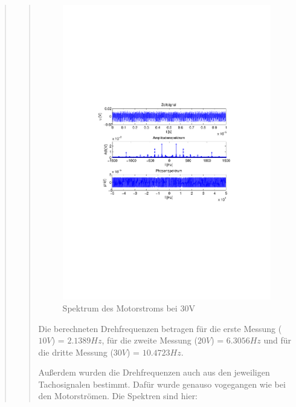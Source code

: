 \begin{quote}
\begin{quote}
	           
	           \begin{figure}[H]
                    \centering
                        \includegraphics[scale=0.63, trim = 1cm 9cm 1.5cm 8cm,
                        clip]{./Bilder/ampl_spektrum_messung3}
                        \caption{Spektrum des Motorstroms bei 30V}
               \end{figure}
	    
	    Die berechneten Drehfrequenzen betragen für die erste Messung ($10V$) =
	    $2.1389 Hz$, für die zweite Messung ($20V$) = $6.3056 Hz$ und für die
	    dritte Messung ($30V$) = $10.4723 Hz$.\\
	    
	    
	    Außerdem wurden die Drehfrequenzen auch aus den jeweiligen Tachosignalen
	    bestimmt. Dafür wurde genauso vogegangen wie bei den Motorströmen. Die
	    Spektren sind hier:
	       

\end{quote}
\end{quote}
